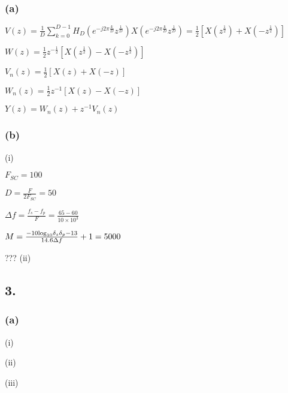 \documentclass{article}
\begin{document}
\subsubsection*{(a)}
$V(z)=\frac{1}{D}\sum_{k=0}^{D-1}H_{D}(e^{-j2\pi\frac{ k}{D}}z^{\frac{1}{D}})X(e^{-j2\pi\frac{ k}{D}}z^{\frac{1}{D}})=\frac{1}{2}[X(z^{\frac{1}{2}})+X(-z^{\frac{1}{2}})]$\par
$W(z)=\frac{1}{2}z^{-\frac{1}{2}}[X(z^{\frac{1}{2}})-X(-z^{\frac{1}{2}})]$\par
$V_{n}(z)=\frac{1}{2}[X(z)+X(-z)]$\par
$W_{n}(z)=\frac{1}{2}z^{-1}[X(z)-X(-z)]$\par
$Y(z)=W_{n}(z)+z^{-1}V_{n}(z)$\par
\subsubsection*{(b)}
(i)\par
$F_{SC}=100$\par
$D=\frac{F}{2F_{SC}}=50$\par
$\Delta f=\frac{f_{s}-f_{p}}{F}=\frac{65-60}{10\times 10^3}$\par
$M=\frac{-10{\rm log}_{10}\delta_{s}\delta_{p}-13}{14.6\Delta f}+1=5000$\par
???
(ii)\par

\subsection*{3.}
\subsubsection*{(a)}
(i)\par
(ii)\par
(iii)\par
\end{document}
